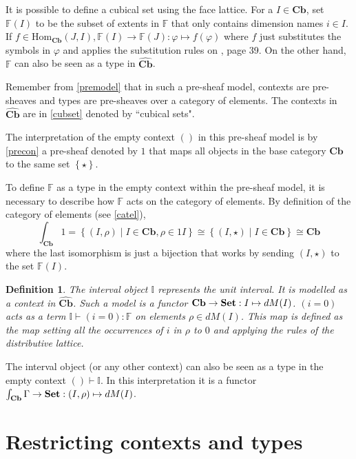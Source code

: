 \documentclass[12pt,a4paper,twoside,xetex]{book} %
\newcommand{\keyword}[1]{\emph{#1}\index{#1}}
\newtheorem{definition}[theorem]{Definition}
\newcommand{\psh}[1]{\widehat{#1}}
\newcommand{\singleton}[0]{\left\{ \star \right\}}
\newcommand{\homo}[3]{\text{Hom}_{#1}\left(#2,#3\right)}
\newcommand{\cube}[0]{\textbf{Cb}}
\begin{document}
It is possible to define a cubical set using the face lattice. For a $I\in 
\cube$, set $\mathbb{F}(I)$ to be the subset of extents in 
$\mathbb{F}$ that only contains dimension names $i \in I$. If $f \in 
\homo{\cube}{J}{I}, \mathbb{F}(I) \rightarrow \mathbb{F}(J): \varphi 
\mapsto f(\varphi)$ where $f$ just substitutes the symbols in $\varphi$ and 
applies the substitution rules on \cite{Orton2019}, page 39. On the other hand, 
$\mathbb{F}$ can also be seen as a type in $\psh{\cube}$. 

Remember from \cref{premodel} that in such a pre-sheaf model, contexts are 
pre-sheaves and types are pre-sheaves over a category of elements. The contexts 
in $\psh{\cube}$ are in \cref{cubset} 
denoted by ``cubical sets".

The interpretation of the empty context $()$ in this pre-sheaf model is by 
\cref{precon} a pre-sheaf denoted by $1$ that maps all objects in the base 
category $\cube$ to the same set $\singleton$. 

To define $\mathbb{F}$ as a type in the empty context within the pre-sheaf 
model, it is necessary to describe how $\mathbb{F}$ acts on the category of 
elements. By definition of the category of elements (see \cref{catel}), 
$$\int_{\cube} 1 = \left\{ (I, \rho ) \mid I \in \cube, \rho \in 1I 
\right\} \cong \left\{ (I, \star ) \mid I \in \cube \right\}  \cong 
\cube$$ where the last isomorphism is just a bijection that works by 
sending $(I, \star )$ to the set $\mathbb{F}(I)$.


\begin{definition}\label{interval}
The \keyword{interval object} $\mathbb{I}$ represents the unit interval. It is 
modelled as a context in $\psh{\cube}$. Such a model is a functor 
$\cube \rightarrow \set : I \mapsto dM(I)$.  $(i=0)$ acts as a term 
$\mathbb{I} \vdash (i = 0) : \mathbb{F}$ on elements $\rho \in dM (I)$. This 
map is defined as the map setting all the occurrences of $i$ in $\rho$ to $0$ 
and applying the rules of the distributive lattice.
\end{definition}

The interval object (or any other context) can also be seen as a type in the empty context $() \vdash \mathbb{I}$. In this interpretation it is a functor  $\int_{\cube} \Gamma \rightarrow 
\set : (I,\rho) \mapsto dM(I)$.



\section{Restricting contexts and types}
\end{document}
